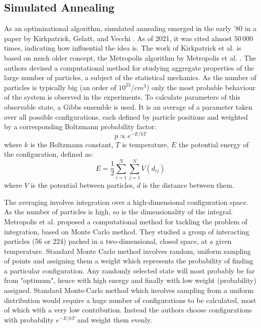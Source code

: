 \subsection{Simulated Annealing}
As an optimizational algorithm, simulated annealing emerged in the early '80 in a paper by Kirkpatrick, Gelatt, and Vecchi \cite{kirkpatrick1983optimization}. As of 2021, it was cited almost 50\,000 times, indicating how influential the idea is. The work of Kirkpatrick et al. is based on much older concept, the Metropolis algorithm by Metropolis et al. \cite{metropolis1953equation}. The authors devised a computational method for studying aggregate properties of the large number of particles, a subject of the statistical mechanics. As the number of particles is typically big (an order of $10^23/cm^3$) only the most probable behaviour of the system is observed in the experiments. To calculate parameters of this observable state, a Gibbs ensemble is used. It is an average of a parameter taken over all possible configurations, each defined by particle positions and weighted by a corresponding Boltzmann probability factor:
\[p\propto e^{-E/kT}\]
where $k$ is the Boltzmann constant, $T$ is temperature, $E$ the potential energy of the configuration, defined as:
\[E=\frac{1}{2}\sum_{i=1}^{N}\sum_{j=1}^{N}V(d_{ij})\]
where $V$ is the potential between particles, $d$ is the distance between them.

The averaging involves integration over a high-dimensional configuration space. As the number of particles is high, so is the dimensionality of the integral. Metropolis et al. proposed a computational method for tackling the problem of integration, based on Monte Carlo method. They studied a group of interacting particles (56 or 224) packed in a two-dimensional, closed space, at a given temperature. Standard Monte Carlo method involves random, uniform sampling of points and assigning them a weight which represents the probability of finding a particular configuration. Any randomly selected state will most probably be far from "optimum", hence with high energy and finally with low weight (probability) assigned. Standard Monte-Carlo method which involves sampling from a uniform distribution would require a huge number of configurations to be calculated, most of which with a very low contribution. Instead the authors choose configurations with probability $e^{-E/kT}$ and weight them evenly.

